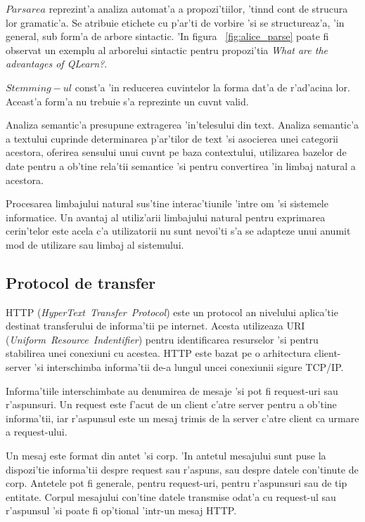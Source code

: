 \documentclass[12pt,a4paper,twoside]{report}
\begin{document}
$Parsarea$ reprezint'a analiza automat'a a propozi'tiilor, 'tin\ia nd cont de strucura lor gramatic'a. Se atribuie etichete cu p'ar'ti de vorbire 'si se structureaz'a, 'in general, sub form'a de arbore sintactic. 'In figura ~\ref{fig:alice_parse} poate fi observat un exemplu al arborelui sintactic pentru propozi'tia {\it What are the advantages of QLearn?}.


$Stemming-ul$ const'a 'in reducerea cuvintelor la forma dat'a de r'ad'acina lor. Aceast'a form'a nu trebuie s'a reprezinte un cuv\ia nt valid.

Analiza semantic'a presupune extragerea 'in'telesului din text. Analiza semantic'a a textului cuprinde determinarea p'ar'tilor de text 'si asocierea unei categorii acestora, oferirea sensului unui cuv\ia nt pe baza contextului, utilizarea bazelor de date pentru a ob'tine rela'tii semantice 'si pentru convertirea 'in limbaj natural a acestora.


Procesarea limbajului natural sus'tine interac'tiunile 'intre om 'si sistemele informatice. Un avantaj al utiliz'arii limbajului natural pentru exprimarea cerin'telor este acela c'a utilizatorii nu sunt nevoi'ti s'a se adapteze unui anumit mod de utilizare sau limbaj al sistemului.

\subsection{Protocol de transfer}
HTTP ({\it HyperText\ Transfer\ Protocol}) este un protocol an nivelului aplica'tie destinat transferului de informa'tii pe internet.
Acesta utilizeaza URI ({\it Uniform\ Resource\ Indentifier}) pentru identificarea resurselor 'si pentru stabilirea unei conexiuni cu acestea. HTTP este bazat pe o arhitectura client-server 'si interschimba informa'tii de-a lungul uncei conexiunii sigure TCP/IP.

Informa'tiile interschimbate au denumirea de mesaje 'si pot fi request-uri sau r'aspunsuri. Un request este f'acut de un client c'atre server pentru a ob'tine informa'tii, iar r'aspunsul este un mesaj trimis de la server c'atre client ca urmare a request-ului. 

Un mesaj este format din antet 'si corp. 'In antetul mesajului sunt puse la dispozi'tie informa'tii despre request sau r'aspuns, sau despre datele con'tinute de corp. Antetele pot fi generale, pentru request-uri, pentru r'aspunsuri sau de tip entitate. Corpul mesajului con'tine datele transmise odat'a cu request-ul sau r'aspunsul 'si poate fi op'tional 'intr-un mesaj HTTP. 
\end{document}
